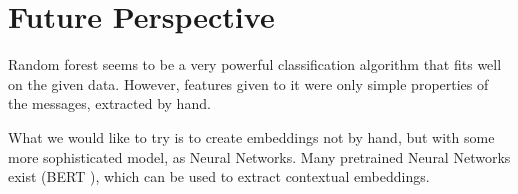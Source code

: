 \documentclass[11pt,a4paper]{article}
\begin{document}
\section{Future Perspective}
Random forest seems to be a very powerful classification algorithm that fits well on the given data. However, features given to it were only simple properties of the messages, extracted by hand. 

What we would like to try is to create embeddings not by hand, but with some more sophisticated model, as Neural Networks. Many pretrained Neural Networks exist (BERT \cite{devlin2018bert}), which can be used to extract contextual embeddings. 








\end{document}
